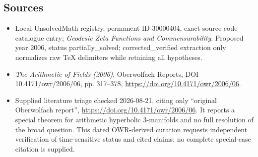 \documentclass[11pt]{article}
\begin{document}
\subsection{Sources}
\begin{itemize}
\item Local UnsolvedMath registry, permanent ID 30000404, exact source code catalogue entry; \emph{Geodesic Zeta Functions and Commensurability}. Proposed year 2006, status partially\_solved; corrected\_verified extraction only normalizes raw TeX delimiters while retaining all hypotheses.
\item \emph{The Arithmetic of Fields (2006)}, Oberwolfach Reports, DOI 10.4171/owr/2006/06, pp. 317--378, \url{https://doi.org/10.4171/owr/2006/06}.
\item Supplied literature triage checked 2026-08-21, citing only ``original Oberwolfach report'', \url{https://doi.org/10.4171/owr/2006/06}. It reports a special theorem for arithmetic hyperbolic $3$-manifolds and no full resolution of the broad question. This dated OWR-derived curation requests independent verification of time-sensitive status and cited claims; no complete special-case citation is supplied.
\end{itemize}
\end{document}
